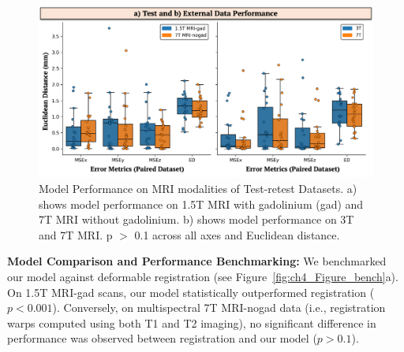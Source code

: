 \begin{figure}[hbt!]
    \centering
    \includegraphics[width=1\linewidth]{figs/ch4_Figure_errs.png}
    \caption{Model Performance on MRI modalities of Test-retest Datasets. a) shows model performance on 1.5T MRI with gadolinium (gad) and 7T MRI without gadolinium. b) shows model performance on 3T and 7T MRI. p \(>\) 0.1 across all axes and Euclidean distance. }
    \label{fig:ch4_Figure_errs}
\end{figure}

\textbf{Model Comparison and Performance Benchmarking:} We benchmarked our model against deformable registration (see Figure~\ref{fig:ch4_Figure_bench}a). On 1.5T MRI-gad scans, our model statistically outperformed registration ($p < 0.001$). Conversely, on multispectral 7T MRI-nogad data (i.e., registration warps computed using both T1 and T2 imaging), no significant difference in performance was observed between registration and our model ($p > 0.1$).

